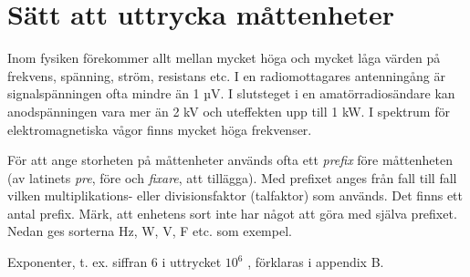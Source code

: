 %
%
%
%
%
%
%

\chapter{Sätt att uttrycka måttenheter}

  Inom fysiken förekommer allt mellan mycket höga och mycket låga
  värden på frekvens, spänning, ström, resistans etc.  I en
  radiomottagares antenningång är signalspänningen ofta mindre än
  1 µV.  I slutsteget i en amatörradiosändare kan anodspänningen vara
  mer än 2 kV och uteffekten upp till 1 kW.  I spektrum för
  elektromagnetiska vågor finns mycket höga frekvenser.

  För att ange storheten på måttenheter används ofta ett \emph{prefix}
  före måttenheten (av latinets \emph{pre}, före och \emph{fixare},
  att tillägga). Med prefixet anges från fall till fall vilken
  multiplikations- eller divisionsfaktor (talfaktor) som används. Det
  finns ett antal prefix.  Märk, att enhetens sort inte har något att
  göra med själva prefixet. Nedan ges sorterna Hz, W, V, F etc. som
  exempel.

  Exponenter, t. ex. siffran 6 i uttrycket \(10^6\) , förklaras i appendix B.

